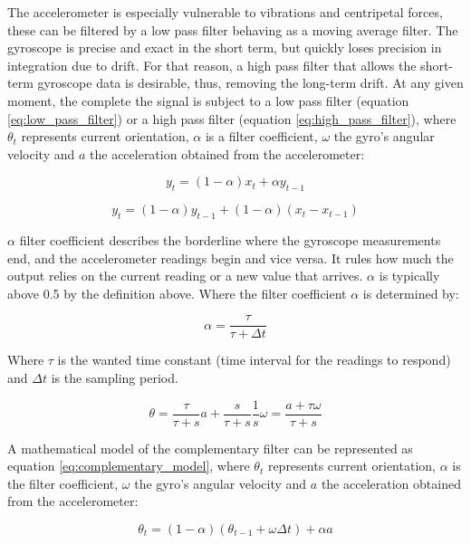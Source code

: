 The accelerometer is especially vulnerable to vibrations and centripetal forces, these can be filtered by a low pass filter behaving as a moving average filter. The gyroscope is precise and exact in the short term, but quickly loses precision in integration due to drift. For that reason, a high pass filter that allows the short-term gyroscope data is desirable, thus, removing the long-term drift.
At any given moment, the complete the signal is subject to a low pass filter (equation \ref{eq:low_pass_filter}) or a high pass filter (equation \ref{eq:high_pass_filter}), where $\theta_t$ represents current orientation, $\alpha$ is a filter coefficient, $\omega$ the gyro's angular velocity and $a$ the acceleration obtained from the accelerometer:

\begin{equation}
    y_t = (1-\alpha)x_{t} + \alpha y_{t-1}
    \label{eq:low_pass_filter}
\end{equation}

\begin{equation}
    y_t = (1-\alpha)y_{t-1} + (1-\alpha) (x_t - x_{t-1})
    \label{eq:high_pass_filter}
\end{equation}

$\alpha$ filter coefficient describes the borderline where the gyroscope measurements end, and the accelerometer readings begin and vice versa. It rules how much the output relies on the current reading or a new value that arrives. $\alpha$ is typically above 0.5 by the definition above. Where the filter coefficient $\alpha$ is determined by:

\begin{equation}
    \alpha = \frac{\tau}{\tau + \Delta t}
\end{equation}

Where $\tau$ is the wanted time constant (time interval for the readings to respond) and $\Delta t$ is the sampling period.

\begin{equation}
    \theta = \frac{\tau}{\tau + s}a + \frac{s}{\tau + s}\frac{1}{s}\omega = \frac{a+\tau \omega}{\tau + s}
\end{equation}

A mathematical model of the complementary filter can be represented as equation \ref{eq:complementary_model}, where $\theta_t$ represents current orientation, $\alpha$ is the filter coefficient, $\omega$ the gyro's angular velocity and $a$ the acceleration obtained from the accelerometer:

\begin{equation}
    \theta_t = (1 - \alpha) (\theta_{t-1} + \omega \Delta t) + \alpha a
    \label{eq:complementary_model}
\end{equation}

